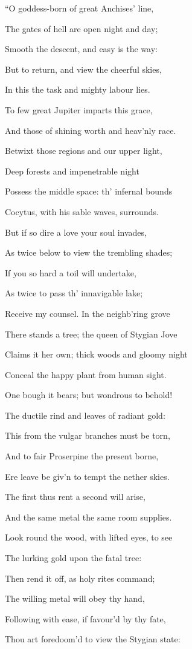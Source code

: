 “O goddess-born of great Anchises’ line,

The gates of hell are open night and day;

Smooth the descent, and easy is the way:

But to return, and view the cheerful skies,

In this the task and mighty labour lies.

To few great Jupiter imparts this grace,

And those of shining worth and heav’nly race.

Betwixt those regions and our upper light,

Deep forests and impenetrable night

Possess the middle space: th’ infernal bounds

Cocytus, with his sable waves, surrounds.

But if so dire a love your soul invades,

As twice below to view the trembling shades;

If you so hard a toil will undertake,

As twice to pass th’ innavigable lake;

Receive my counsel. In the neighb’ring grove

There stands a tree; the queen of Stygian Jove

Claims it her own; thick woods and gloomy night

Conceal the happy plant from human sight.

One bough it bears; but wondrous to behold!

The ductile rind and leaves of radiant gold:

This from the vulgar branches must be torn,

And to fair Proserpine the present borne,

Ere leave be giv’n to tempt the nether skies.

The first thus rent a second will arise,

And the same metal the same room supplies.

Look round the wood, with lifted eyes, to see

The lurking gold upon the fatal tree:

Then rend it off, as holy rites command;

The willing metal will obey thy hand,

Following with ease, if favour’d by thy fate,

Thou art foredoom’d to view the Stygian state:

